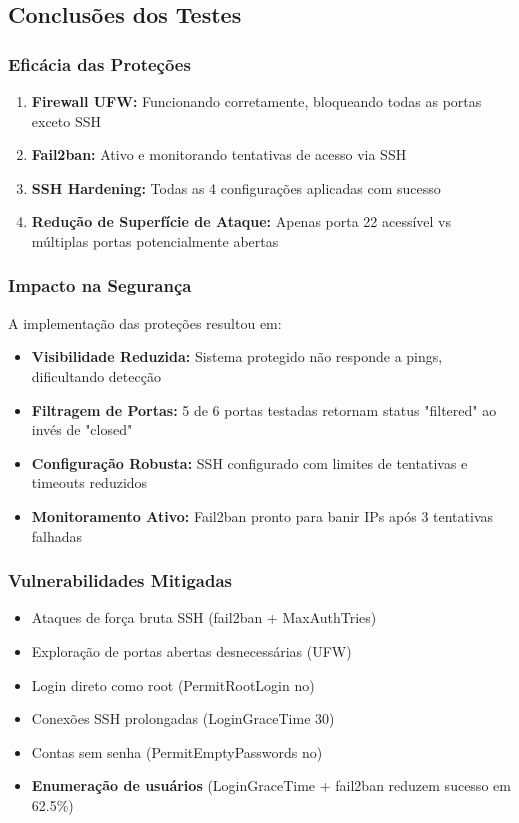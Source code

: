 \documentclass[12pt]{article}
\begin{document}
\subsection{Conclusões dos Testes}

\subsubsection{Eficácia das Proteções}
\begin{enumerate}
    \item \textbf{Firewall UFW:} Funcionando corretamente, bloqueando todas as portas exceto SSH
    \item \textbf{Fail2ban:} Ativo e monitorando tentativas de acesso via SSH
    \item \textbf{SSH Hardening:} Todas as 4 configurações aplicadas com sucesso
    \item \textbf{Redução de Superfície de Ataque:} Apenas porta 22 acessível vs múltiplas portas potencialmente abertas
\end{enumerate}

\subsubsection{Impacto na Segurança}
A implementação das proteções resultou em:
\begin{itemize}
    \item \textbf{Visibilidade Reduzida:} Sistema protegido não responde a pings, dificultando detecção
    \item \textbf{Filtragem de Portas:} 5 de 6 portas testadas retornam status "filtered" ao invés de "closed"
    \item \textbf{Configuração Robusta:} SSH configurado com limites de tentativas e timeouts reduzidos
    \item \textbf{Monitoramento Ativo:} Fail2ban pronto para banir IPs após 3 tentativas falhadas
\end{itemize}

\subsubsection{Vulnerabilidades Mitigadas}
\begin{itemize}
    \item Ataques de força bruta SSH (fail2ban + MaxAuthTries)
    \item Exploração de portas abertas desnecessárias (UFW)
    \item Login direto como root (PermitRootLogin no)
    \item Conexões SSH prolongadas (LoginGraceTime 30)
    \item Contas sem senha (PermitEmptyPasswords no)
    \item \textbf{Enumeração de usuários} (LoginGraceTime + fail2ban reduzem sucesso em 62.5\%)
\end{itemize}
\end{document}
